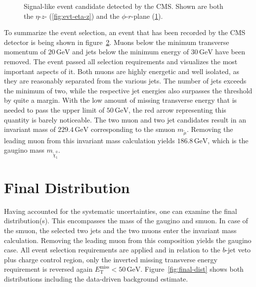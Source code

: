 \begin{figure}[!htbp]
\begin{subfigure}[b]{0.75\textwidth}
    \caption{\label{fig:evt-phi-r}}
  \end{subfigure}
  \caption{Signal-like event candidate detected by the CMS. Shown are both the $\eta$-$z$- (\ref{fig:evt-eta-z}) and the $\phi$-$r$-plane (\ref{fig:evt-phi-r}).}
  \label{fig:evt-display}
\end{figure}

\noindent To summarize the event selection, an event that has been recorded by the CMS detector is being shown in figure~\ref{fig:evt-display}. Muons below the minimum transverse momentum of $20\,\text{GeV}$ and jets below the minimum energy of $30\,\text{GeV}$ have been removed. The event passed all selection requirements and visualizes the most important aspects of it. Both muons are highly energetic and well isolated, as they are reasonably separated from the various jets. The number of jets exceeds the minimum of two, while the respective jet energies also surpasses the threshold by quite a margin. With the low amount of missing transverse energy that is needed to pass the upper limit of $50\,\text{GeV}$, the red arrow representing this quantity is barely noticeable. The two muon and two jet candidates result in an invariant mass of $229.4\,\text{GeV}$ corresponding to the smuon $m_{\tilde{\mu}}$. Removing the leading muon from this invariant mass calculation yields $186.8\,\text{GeV}$, which is the gaugino mass $m_{\tilde{\chi}^0_1}$.

\section{Final Distribution}
\label{sec:final-dist}

Having accounted for the systematic uncertainties, one can examine the final distribution(s). This encompasses the mass of the gaugino and smuon. In case of the smuon, the selected two jets and the two muons enter the invariant mass calculation. Removing the leading muon from this composition yields the gaugino case. All event selection requirements are applied and in relation to the $b$-jet veto plus charge control region, only the inverted missing transverse energy requirement is reversed again $E_{\text{T}}^{\text{miss}} < 50\,\text{GeV}$. Figure~\ref{fig:final-dist} shows both distributions including the data-driven background estimate.

